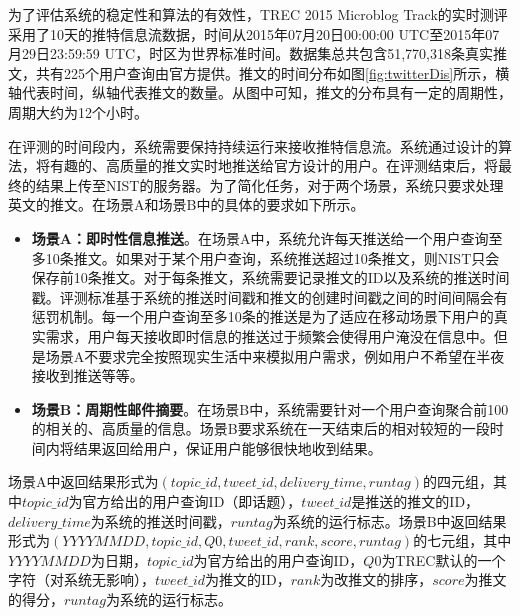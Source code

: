 为了评估系统的稳定性和算法的有效性，TREC 2015 Microblog Track的实时测评采用了10天的推特信息流数据，时间从2015年07月20日00:00:00 UTC至2015年07月29日23:59:59 UTC，时区为世界标准时间。数据集总共包含51,770,318条真实推文，共有225个用户查询由官方提供。推文的时间分布如图\ref{fig:twitterDis}所示，横轴代表时间，纵轴代表推文的数量。从图中可知，推文的分布具有一定的周期性，周期大约为12个小时。

在评测的时间段内，系统需要保持持续运行来接收推特信息流。系统通过设计的算法，将有趣的、高质量的推文实时地推送给官方设计的用户。在评测结束后，将最终的结果上传至NIST的服务器。为了简化任务，对于两个场景，系统只要求处理英文的推文。在场景A和场景B中的具体的要求如下所示。
\begin{itemize}
  \item \textbf{场景A：即时性信息推送}。在场景A中，系统允许每天推送给一个用户查询至多10条推文。如果对于某个用户查询，系统推送超过10条推文，则NIST只会保存前10条推文。对于每条推文，系统需要记录推文的ID以及系统的推送时间戳。评测标准基于系统的推送时间戳和推文的创建时间戳之间的时间间隔会有惩罚机制。每一个用户查询至多10条的推送是为了适应在移动场景下用户的真实需求，用户每天接收即时信息的推送过于频繁会使得用户淹没在信息中。但是场景A不要求完全按照现实生活中来模拟用户需求，例如用户不希望在半夜接收到推送等等。
  \item \textbf{场景B：周期性邮件摘要}。在场景B中，系统需要针对一个用户查询聚合前100的相关的、高质量的信息。场景B要求系统在一天结束后的相对较短的一段时间内将结果返回给用户，保证用户能够很快地收到结果。
\end{itemize}

场景A中返回结果形式为$(topic\_id,tweet\_id,delivery\_time,runtag)$的四元组，其中$topic\_id$为官方给出的用户查询ID（即话题），$tweet\_id$是推送的推文的ID，$delivery\_time$为系统的推送时间戳，$runtag$为系统的运行标志。场景B中返回结果形式为$(YYYYMMDD, topic\_id, Q0, tweet\_id, rank, score, runtag)$的七元组，其中$YYYYMMDD$为日期，$topic\_id$为官方给出的用户查询ID，$Q0$为TREC默认的一个字符（对系统无影响），$tweet\_id$为推文的ID，$rank$为改推文的排序，$score$为推文的得分，$runtag$为系统的运行标志。
